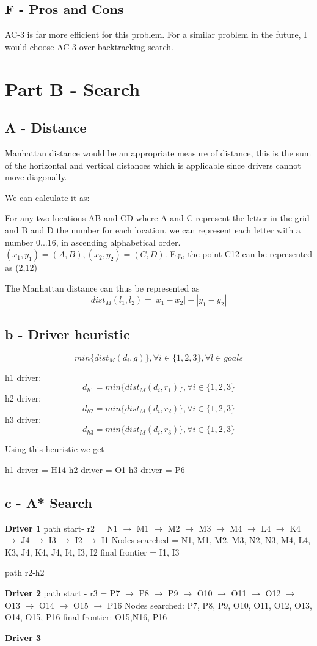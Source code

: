\documentclass{article}
\begin{document}
\subsection{F - Pros and Cons}

AC-3 is far more efficient for this problem. For a similar problem in the future, I would choose AC-3 over backtracking search. 

\section{Part B - Search}

\subsection{A - Distance}

Manhattan distance would be an appropriate measure of distance, this is the sum of the horizontal and vertical distances which is applicable since drivers cannot move diagonally.

We can calculate it as:

For any two locations AB and CD where A and C represent the letter in the grid and B and D the number for each location, we can represent each letter with a number $0...16$, in ascending alphabetical order. $(x_1,y_1) = (A,B), (x_2,y_2) = (C,D)$.
E.g, the point C12 can be represented as (2,12)

The Manhattan distance can thus be represented as $$dist_M(l_1,l_2) = |x_1-x_2|+ |y_1-y_2|$$

\subsection{b - Driver heuristic}
$$ min\{dist_M(d_i, g)\}, \forall i \in \{1,2,3\}, \forall l \in goals$$

h1 driver: $$d_{h1} = min\{dist_M(d_i, r_1)\}, \forall i \in \{1,2,3\}$$
h2 driver: $$d_{h2} = min\{dist_M(d_i, r_2)\}, \forall i \in \{1,2,3\}$$
h3 driver: $$d_{h3} = min\{dist_M(d_i, r_3)\}, \forall i \in \{1,2,3\}$$

Using this heuristic we get 

h1 driver = H14
h2 driver = O1
h3 driver = P6

\subsection{c - A* Search}

\textbf{Driver 1} \newline
path start- r2 = N1 $\to$ M1 $\to $ M2 $\to$ M3 $\to$ M4 $\to$ L4 $\to$ K4 $\to$ J4 $\to$ I3 $\to$ I2 $\to$ I1 \newline
Nodes searched = N1, M1, M2, M3, N2, N3, M4, L4, K3, J4, K4, J4, I4, I3, I2 \newline
final frontier = I1, I3 \newline

path r2-h2

\textbf{Driver 2} \newline
path start - r3 = P7 $\to$ P8 $\to$ P9 $\to$ O10 $\to$ O11 $\to$ O12 $\to$ O13 $\to$ O14 $\to$ O15 $\to$ P16 \newline
Nodes searched: P7, P8, P9, O10, O11, O12, O13, O14, O15, P16 \newline
final frontier: O15,N16, P16



\textbf{Driver 3} \newline
\end{document}
